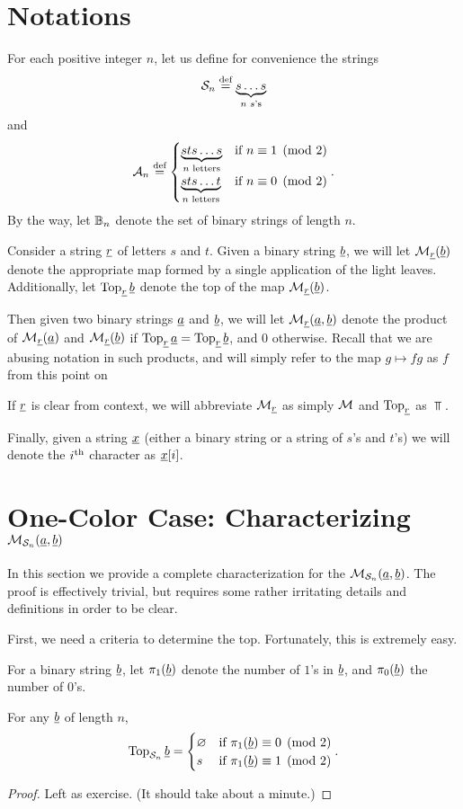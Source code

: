 \section{Notations}
For each positive integer $n$, let us define for convenience the strings
\[ \mathcal S_n \stackrel{\text{def}}{=} \underbrace{s \dots s}_{\text{$n$ $s$'s}} \] 
and
\[
	\mathcal A_n \stackrel{\text{def}}{=}
	\begin{cases}
		\underbrace{sts\dots s}_{\text{$n$ letters}} & \text{if } n \equiv 1 \pmod{2} \\
		\underbrace{sts\dots t}_{\text{$n$ letters}} & \text{if } n \equiv 0 \pmod{2} \\
	\end{cases}.
\]
By the way, let $\mathbb B_n$ denote the set of binary strings of length $n$.

Consider a string $\underline{r}$ of letters $s$ and $t$.  Given a binary string $\underline{b}$, we will let $\mathcal M_{\underline{r}}(\underline{b})$ denote the appropriate map formed by a single application of the light leaves.  
Additionally, let $\operatorname{Top}_{\underline{r}} \underline{b}$ denote the top of the map $\mathcal M_{\underline{r}}(\underline{b})$.

Then given two binary strings $\underline{a}$ and $\underline{b}$, we will let $\mathcal M_{\underline{r}}(\underline{a}, \underline{b})$ denote the product of $\mathcal M_{\underline{r}}(\underline{a})$ and $\mathcal M_{\underline{r}}(\underline{b})$ if $\operatorname{Top}_{\underline{r}} \underline{a} = \operatorname{Top}_{\underline{r}} \underline{b}$, and $0$ otherwise.  Recall that we are abusing notation in such products, and will simply refer to the map $g \mapsto fg$ as $f$ from this point on

If $\underline{r}$ is clear from context, we will abbreviate $\mathcal M_{\underline{r}}$ as simply $\mathcal M$ and $\operatorname{Top}_{\underline{r}}$ as $\Top$.

Finally, given a string $\underline{x}$ (either a binary string or a string of $s$'s and $t$'s) we will denote the $i^{\text{th}}$ character as $\underline{x}[i]$.

\section{One-Color Case: Characterizing $\mathcal M_{\mathcal S_n}(\underline{a}, \underline{b})$}
In this section we provide a complete characterization for the $\mathcal M_{\mathcal S_n}(\underline{a}, \underline{b})$.  The proof is effectively trivial, but requires some rather irritating details and definitions in order to be clear.

First, we need a criteria to determine the top.  Fortunately, this is extremely easy.
\begin{definition*}
	For a binary string $\underline{b}$, let $\pi_1(\underline{b})$ denote the number of $1$'s in $\underline{b}$, and $\pi_0(\underline{b})$ the number of $0$'s.
\end{definition*}
\begin{proposition}
	For any $\underline{b}$ of length $n$, \[
		\operatorname{Top}_{\mathcal S_n} \underline{b} =
		\begin{cases}
			\varnothing & \text{if } \pi_1(\underline{b}) \equiv 0 \pmod{2} \\
			s & \text{if } \pi_1(\underline{b}) \equiv 1 \pmod{2} \\
		\end{cases}.
		\]
\end{proposition}
\begin{proof}
	Left as exercise. (It should take about a minute.)
\end{proof}

